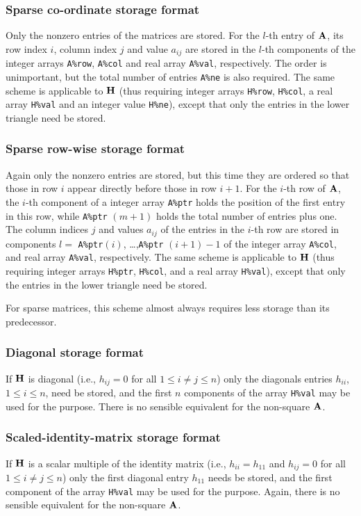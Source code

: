 \documentclass{galahad}
\begin{document}
\subsubsection{Sparse co-ordinate storage format}\label{coordinate}
Only the nonzero entries of the matrices are stored. For the
$l$-th entry of ${\mathbf{A}}$, its row index $i$, column index $j$
and value $a_{ij}$
are stored in the $l$-th components of the integer arrays {\tt A\%row},
{\tt A\%col} and real array {\tt A\%val}, respectively.
The order is unimportant, but the total
number of entries {\tt A\%ne} is also required.
The same scheme is applicable to
${\mathbf{H}}$ (thus requiring integer arrays {\tt H\%row}, {\tt H\%col}, a real array
{\tt H\%val} and an integer value {\tt H\%ne}),
except that only the entries in the lower triangle need be stored.

\subsubsection{Sparse row-wise storage format}\label{rowwise}
Again only the nonzero entries are stored, but this time
they are ordered so that those in row $i$ appear directly before those
in row $i+1$. For the $i$-th row of ${\mathbf{A}}$, the $i$-th component of a
integer array {\tt A\%ptr} holds the position of the first entry in this row,
while {\tt A\%ptr} $(m+1)$ holds the total number of entries plus one.
The column indices $j$ and values $a_{ij}$ of the entries in the $i$-th row
are stored in components
$l =$ {\tt A\%ptr}$(i)$, \ldots ,{\tt A\%ptr} $(i+1)-1$ of the
integer array {\tt A\%col}, and real array {\tt A\%val}, respectively.
The same scheme is applicable to
${\mathbf{H}}$ (thus requiring integer arrays {\tt H\%ptr}, {\tt H\%col}, and
a real array {\tt H\%val}),
except that only the entries in the lower triangle need be stored.

For sparse matrices, this scheme almost always requires less storage than
its predecessor.

\subsubsection{Diagonal storage format}\label{diagonal}
If ${\mathbf{H}}$ is diagonal (i.e., $h_{ij} = 0$ for all $1 \leq i \neq j \leq n$)
only the diagonals entries $h_{ii}$, $1 \leq i \leq n$,  need be stored,
and the first $n$ components of the array {\tt H\%val} may be used for
the purpose. There is no sensible equivalent for the non-square ${\mathbf{A}}$.

\subsubsection{Scaled-identity-matrix storage format}\label{scaled-identity}
If ${\mathbf{H}}$ is a scalar multiple of the identity matrix
(i.e., $h_{ii} = h_{11}$  and $h_{ij} = 0$ for all $1 \leq i \neq j \leq n$)
only the first diagonal entry $h_{11}$ needs be stored,
and the first component of the array {\tt H\%val} may be used for
the purpose. Again, there is no sensible equivalent for the non-square ${\mathbf{A}}$.
\end{document}
